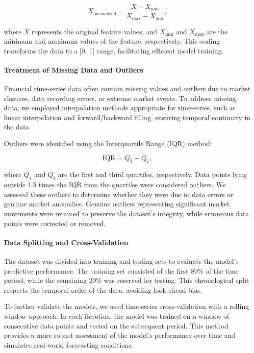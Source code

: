 \begin{equation}
    X_{\text{normalized}} = \frac{X - X_{\text{min}}}{X_{\text{max}} - X_{\text{min}}},
\end{equation}

where $X$ represents the original feature values, and $X_{\text{min}}$ and $X_{\text{max}}$ are the minimum and maximum values of the feature, respectively. This scaling transforms the data to a [0, 1] range, facilitating efficient model training.

\paragraph{Treatment of Missing Data and Outliers}

Financial time-series data often contain missing values and outliers due to market closures, data recording errors, or extreme market events. To address missing data, we employed interpolation methods appropriate for time-series, such as linear interpolation and forward/backward filling, ensuring temporal continuity in the data.

Outliers were identified using the Interquartile Range (IQR) method:

\begin{equation}
    \text{IQR} = Q_3 - Q_1,
\end{equation}

where $Q_1$ and $Q_3$ are the first and third quartiles, respectively. Data points lying outside 1.5 times the IQR from the quartiles were considered outliers. We assessed these outliers to determine whether they were due to data errors or genuine market anomalies. Genuine outliers representing significant market movements were retained to preserve the dataset's integrity, while erroneous data points were corrected or removed.

\paragraph{Data Splitting and Cross-Validation}

The dataset was divided into training and testing sets to evaluate the model's predictive performance. The training set consisted of the first 80\% of the time period, while the remaining 20\% was reserved for testing. This chronological split respects the temporal order of the data, avoiding look-ahead bias.

To further validate the models, we used time-series cross-validation with a rolling window approach. In each iteration, the model was trained on a window of consecutive data points and tested on the subsequent period. This method provides a more robust assessment of the model's performance over time and simulates real-world forecasting conditions.

